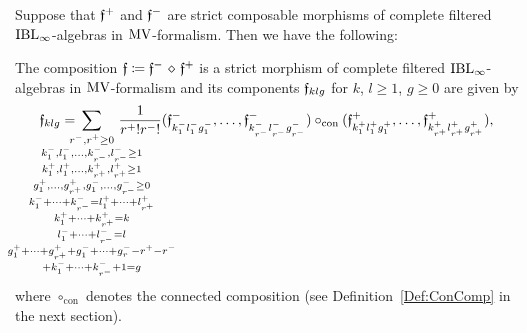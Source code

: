\documentclass[\MainFolder/Text.tex]{subfiles}
\begin{document}
\begin{Proposition}
Suppose that $\mathfrak{f}^+$ and $\mathfrak{f}^-$ are strict composable morphisms of complete filtered $\mathrm{IBL}_\infty$-algebras in $\mathrm{MV}$-formalism. Then we have the following:
\begin{ClaimList}[resume]
\item The composition $\MVMorF\coloneqq \MVMorF^-\DiamComp\MVMorF^+$ is a strict morphism of complete filtered $\mathrm{IBL}_\infty$-algebras in $\mathrm{MV}$-formalism and its components $\mathfrak{f}_{klg}$ for $k$, $l\ge 1$, $g\ge 0$ are given by
\begin{equation}\label{Eq:CompositionOfMorphisms}
\HTP_{klg} = \hspace{-1.8cm}\sum_{\substack{r^-, r^+ \ge 0 \\ k_{1}^-, l_1^-, \dotsc, k_{r^-}^-, l_{r^-}^- \ge 1 \\ k_{1}^+, l_1^+,\dotsc, k_{r^+}^+, l_{r^+}^+ \ge 1  \\ g_1^+, \dotsc, g_{r^+}^+, g_1^-,\dotsc, g_{r^-}^- \ge 0 \\ k_1^- + \dotsb + k^-_{r^-} = l_1^+ + \dotsb + l_{r^+}^+ \\ k_1^+ + \dotsb + k_{r^+}^+ = k \\ l_1^- + \dotsb + l_{r^-}^- = l \\ g_1^+ + \dotsb + g_{r^+}^+ + g_1^- + \dotsb + g_r^- - r^+ - r^- \\ 
+ k_1^- + \dotsb + k_{r^-}^- + 1 = g}}\hspace{-1.5cm}\frac{1}{r^+! r^-!} (\HTP^-_{k_1^- l_1^- g_1^-},\dotsc,\HTP^-_{k_{r^-}^- l_{r^-}^- g_{r^-}^-})\circ_{\mathrm{con}} (\HTP^+_{k_1^+ l_1^+ g_1^+},\dotsc,\HTP^+_{k_{r^+}^+ l_{r^+}^+ g_{r^+}^+}),
\end{equation}
where $\circ_{\mathrm{con}}$ denotes the connected composition (see Definition~\ref{Def:ConComp} in the next section).
\end{ClaimList}
\end{Proposition}
\end{document}
